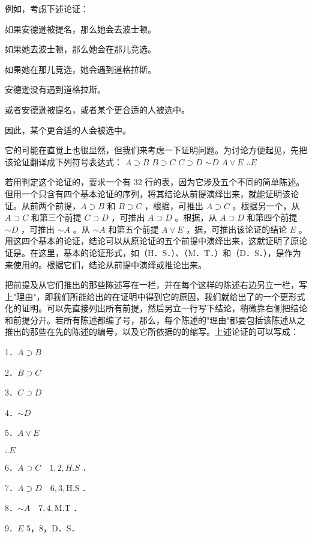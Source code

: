 \begin{examplebox}[title=形式证明的应用实例]
例如，考虑下述论证：

如果安德逊被提名，那么她会去波士顿。

如果她去波士顿，那么她会在那儿竞选。

如果她在那儿竞选，她会遇到道格拉斯。

安德逊没有遇到道格拉斯。

或者安德逊被提名，或者某个更合适的人被选中。

因此，某个更合适的人会被选中。
\end{examplebox}

它的可能在直觉上也很显然，但我们来考虑一下证明问题。为讨论方便起见，先把该论证翻译成下列符号表达式：
$A \supset B$
$B \supset C$
$C \supset D$
$\sim D$
$A \vee E$
$\therefore E$

若用判定这个论证的，要求一个有 32 行的表，因为它涉及五个不同的简单陈述。但用一个只含有四个基本论证的序列，将其结论从前提演绎出来，就能证明该论证。从前两个前提，$A \supset B$ 和 $B \supset C$ ，根据，可推出 $A \supset C$ 。根据另一个，从 $A \supset C$ 和第三个前提 $C \supset D$ ，可推出 $A \supset D$ 。根据，从 $A \supset D$ 和第四个前提 $\sim D$ ，可推出 $\sim A$ 。从 $\sim A$ 和第五个前提 $A \vee E$ ，据，可推出该论证的结论 $E$ 。用这四个基本的论证，结论可以从原论证的五个前提中演绎出来，这就证明了原论证是。在这里，基本的论证形式，如（H．S．）、（M．T．）和（D．S．），是作为来使用的。根据它们，结论从前提中演绎或推论出来。

把前提及从它们推出的那些陈述写在一栏，并在每个这样的陈述右边另立一栏，写上"理由"，即我们所能给出的在证明中得到它的原因，我们就给出了的一个更形式化的证明。可以先直接列出所有前提，然后另立一行写下结论，稍微靠右侧把结论和前提分开。若所有陈述都编了号，那么，每个陈述的"理由"都要包括该陈述从之推出的那些在先的陈述的编号，以及它所依据的的缩写。上述论证的可以写成：

\begin{examplebox}[title=形式证明的格式]
1．$A \supset B$

2．$B \supset C$

3．$C \supset D$

4．$\sim D$

5．$A \vee E$

$\therefore E$

6．$A \supset C \quad 1,2, H . S$ ．

7．$A \supset D \quad 6,3, \mathrm{H} . \mathrm{S}$ ．

8．$\sim A \quad 7,4, \mathrm{M} . \mathrm{T}$ ．

9．$E$ 5，8，D．S．
\end{examplebox}


